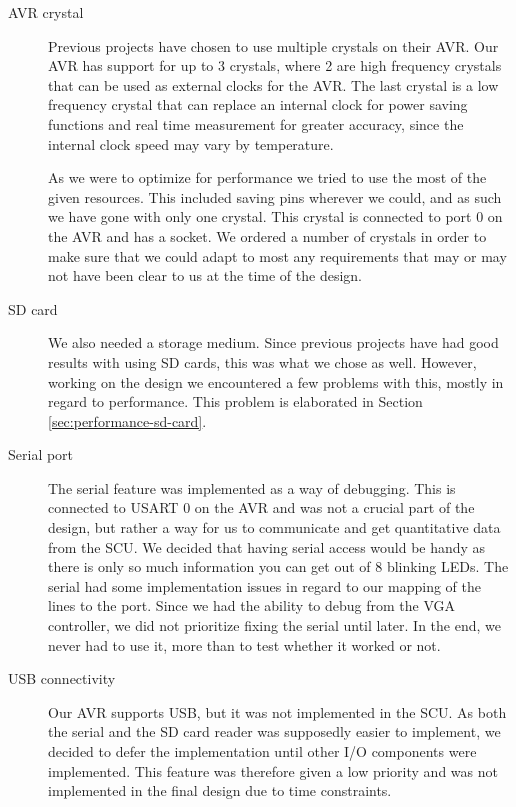 \begin{description}

\item[AVR crystal] \hfill

Previous projects have chosen to use multiple crystals on their AVR. Our AVR has support for up to 3 crystals, where 2 are high frequency crystals that can be used as external clocks for the AVR. The last crystal is a low frequency crystal that can replace an internal clock for power saving functions and real time measurement for greater accuracy, since the internal clock speed may vary by temperature.

As we were to optimize for performance we tried to use the most of the given resources. This included saving pins wherever we could, and as such we have gone with only one crystal. This crystal is connected to port 0 on the AVR and has a socket. We ordered a number of crystals in order to make sure that we could adapt to most any requirements that may or may not have been clear to us at the time of the design.

\item[SD card]  \hfill %

We also needed a storage medium. Since previous projects have had good results with
using \ac{SD} cards, this was what we chose as well. However, working on the
design we encountered a few problems with this, mostly in
regard to performance. This problem is elaborated in Section
\ref{sec:performance-sd-card}.

\item[Serial port]  \hfill

The serial feature was implemented as a way of debugging. This is connected to
\ac{USART} 0 on the AVR and was not a crucial part of the design, but rather a
way for us to communicate and get quantitative data from the \ac{SCU}. We
decided that having serial access would be handy as there is only so much
information you can get out of 8 blinking \acp{LED}. The serial had some
implementation issues in regard to our mapping of the lines to the port. Since
we had the ability to debug from the \ac{VGA} controller, we did not prioritize
fixing the serial until later. In the end, we never had to use it, more than to
test whether it worked or not.

\item[USB connectivity]  \hfill 

Our AVR supports \ac{USB}, but it was not implemented in the \ac{SCU}. As both
the serial and the \ac{SD} card reader was supposedly easier to
implement\cite{berg2011festinalente}, we decided to defer the implementation
until other \ac{I/O} components were implemented. This feature was therefore
given a low priority and was not implemented in the final design due to time
constraints.
 

\end{description}
